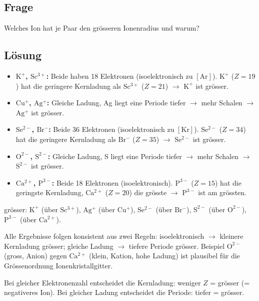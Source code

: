 
\subsection*{Frage}
Welches Ion hat je Paar den grösseren Ionenradius und warum?

\subsection*{Lösung}
\begin{itemize}
  \item \textbf{$\mathrm{K^+}$, $\mathrm{Sc^{3+}}$:} Beide haben 18 Elektronen
    (isoelektronisch zu $[\mathrm{Ar}]$). $\mathrm{K^+}$ ($Z=19$) hat die
    geringere Kernladung als $\mathrm{Sc^{3+}}$ ($Z=21$) $\to$ $\mathrm{K^+}$ ist
    grösser.
  \item \textbf{$\mathrm{Cu^+}$, $\mathrm{Ag^+}$:} Gleiche Ladung, Ag liegt eine
    Periode tiefer $\to$ mehr Schalen $\to$ $\mathrm{Ag^+}$ ist grösser.
  \item \textbf{$\mathrm{Se^{2-}}$, $\mathrm{Br^-}$:} Beide 36 Elektronen
    (isoelektronisch zu $[\mathrm{Kr}]$). $\mathrm{Se^{2-}}$ ($Z=34$) hat die
    geringere Kernladung als $\mathrm{Br^-}$ ($Z=35$) $\to$ $\mathrm{Se^{2-}}$
    ist grösser.
  \item \textbf{$\mathrm{O^{2-}}$, $\mathrm{S^{2-}}$:} Gleiche Ladung, S liegt
    eine Periode tiefer $\to$ mehr Schalen $\to$ $\mathrm{S^{2-}}$ ist grösser.
  \item \textbf{$\mathrm{Ca^{2+}}$, $\mathrm{P^{3-}}$:} Beide 18 Elektronen
    (isoelektronisch). $\mathrm{P^{3-}}$ ($Z=15$) hat die geringste Kernladung,
    $\mathrm{Ca^{2+}}$ ($Z=20$) die grösste $\to$ $\mathrm{P^{3-}}$ ist am
    grössten.
\end{itemize}

\begin{ergebnis}
grösser: $\mathrm{K^+}$ (über $\mathrm{Sc^{3+}}$), $\mathrm{Ag^+}$ (über
$\mathrm{Cu^+}$), $\mathrm{Se^{2-}}$ (über $\mathrm{Br^-}$), $\mathrm{S^{2-}}$
(über $\mathrm{O^{2-}}$), $\mathrm{P^{3-}}$ (über $\mathrm{Ca^{2+}}$).
\end{ergebnis}

\begin{kontrolle}
Alle Ergebnisse folgen konsistent aus zwei Regeln: isoelektronisch $\to$
kleinere Kernladung grösser; gleiche Ladung $\to$ tiefere Periode grösser.
Beispiel $\mathrm{O^{2-}}$ (gross, Anion) gegen $\mathrm{Ca^{2+}}$ (klein,
Kation, hohe Ladung) ist plausibel für die Grössenordnung Ionenkristallgitter.
\end{kontrolle}

\begin{merksatz}
Bei gleicher Elektronenzahl entscheidet die Kernladung: weniger $Z$ = grösser
(= negativeres Ion). Bei gleicher Ladung entscheidet die Periode: tiefer =
grösser.
\end{merksatz}
